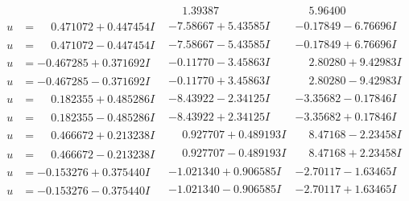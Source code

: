 \documentclass[1p]{elsarticle_modified}
\theoremstyle{definition}
\begin{document}
$$\begin{array}{c|c|c}
 & \phantom{-}1.39387\phantom{ +0.000000I} & \phantom{-}5.96400\phantom{ +0.000000I} \\ \hline\begin{aligned}
u &= \phantom{-}0.471072 + 0.447454 I\end{aligned}
 & -7.58667 + 5.43585 I & -0.17849 - 6.76696 I \\ \hline\begin{aligned}
u &= \phantom{-}0.471072 - 0.447454 I\end{aligned}
 & -7.58667 - 5.43585 I & -0.17849 + 6.76696 I \\ \hline\begin{aligned}
u &= -0.467285 + 0.371692 I\end{aligned}
 & -0.11770 - 3.45863 I & \phantom{-}2.80280 + 9.42983 I \\ \hline\begin{aligned}
u &= -0.467285 - 0.371692 I\end{aligned}
 & -0.11770 + 3.45863 I & \phantom{-}2.80280 - 9.42983 I \\ \hline\begin{aligned}
u &= \phantom{-}0.182355 + 0.485286 I\end{aligned}
 & -8.43922 - 2.34125 I & -3.35682 - 0.17846 I \\ \hline\begin{aligned}
u &= \phantom{-}0.182355 - 0.485286 I\end{aligned}
 & -8.43922 + 2.34125 I & -3.35682 + 0.17846 I \\ \hline\begin{aligned}
u &= \phantom{-}0.466672 + 0.213238 I\end{aligned}
 & \phantom{-}0.927707 + 0.489193 I & \phantom{-}8.47168 - 2.23458 I \\ \hline\begin{aligned}
u &= \phantom{-}0.466672 - 0.213238 I\end{aligned}
 & \phantom{-}0.927707 - 0.489193 I & \phantom{-}8.47168 + 2.23458 I \\ \hline\begin{aligned}
u &= -0.153276 + 0.375440 I\end{aligned}
 & -1.021340 + 0.906585 I & -2.70117 - 1.63465 I \\ \hline\begin{aligned}
u &= -0.153276 - 0.375440 I\end{aligned}
 & -1.021340 - 0.906585 I & -2.70117 + 1.63465 I \\ \hline\begin{aligned}

\end{aligned}
\end{array}$$
\end{document}
